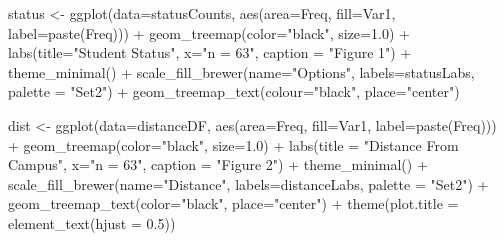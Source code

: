 \documentclass[
  letterpaper,
  DIV=11,
  numbers=noendperiod]{scrartcl}
\newenvironment{Shaded}{\begin{snugshade}}{\end{snugshade}}
\newcommand{\AttributeTok}[1]{\textcolor[rgb]{0.40,0.45,0.13}{#1}}
\newcommand{\FloatTok}[1]{\textcolor[rgb]{0.68,0.00,0.00}{#1}}
\newcommand{\FunctionTok}[1]{\textcolor[rgb]{0.28,0.35,0.67}{#1}}
\newcommand{\NormalTok}[1]{\textcolor[rgb]{0.00,0.23,0.31}{#1}}
\newcommand{\OtherTok}[1]{\textcolor[rgb]{0.00,0.23,0.31}{#1}}
\newcommand{\SpecialCharTok}[1]{\textcolor[rgb]{0.37,0.37,0.37}{#1}}
\newcommand{\StringTok}[1]{\textcolor[rgb]{0.13,0.47,0.30}{#1}}
\begin{document}
\begin{Shaded}
\begin{Highlighting}[]
\NormalTok{status }\OtherTok{\textless{}{-}} \FunctionTok{ggplot}\NormalTok{(}\AttributeTok{data=}\NormalTok{statusCounts, }\FunctionTok{aes}\NormalTok{(}\AttributeTok{area=}\NormalTok{Freq, }\AttributeTok{fill=}\NormalTok{Var1, }\AttributeTok{label=}\FunctionTok{paste}\NormalTok{(Freq))) }\SpecialCharTok{+} 
  \FunctionTok{geom\_treemap}\NormalTok{(}\AttributeTok{color=}\StringTok{"black"}\NormalTok{, }\AttributeTok{size=}\FloatTok{1.0}\NormalTok{) }\SpecialCharTok{+}
  \FunctionTok{labs}\NormalTok{(}\AttributeTok{title=}\StringTok{"Student Status"}\NormalTok{, }\AttributeTok{x=}\StringTok{"n = 63"}\NormalTok{, }\AttributeTok{caption =} \StringTok{"Figure 1"}\NormalTok{) }\SpecialCharTok{+} 
  \FunctionTok{theme\_minimal}\NormalTok{() }\SpecialCharTok{+}
  \FunctionTok{scale\_fill\_brewer}\NormalTok{(}\AttributeTok{name=}\StringTok{"Options"}\NormalTok{, }\AttributeTok{labels=}\NormalTok{statusLabs, }\AttributeTok{palette =} \StringTok{"Set2"}\NormalTok{) }\SpecialCharTok{+} 
  \FunctionTok{geom\_treemap\_text}\NormalTok{(}\AttributeTok{colour=}\StringTok{"black"}\NormalTok{, }\AttributeTok{place=}\StringTok{"center"}\NormalTok{) }
  

\NormalTok{dist }\OtherTok{\textless{}{-}} \FunctionTok{ggplot}\NormalTok{(}\AttributeTok{data=}\NormalTok{distanceDF, }\FunctionTok{aes}\NormalTok{(}\AttributeTok{area=}\NormalTok{Freq, }\AttributeTok{fill=}\NormalTok{Var1, }\AttributeTok{label=}\FunctionTok{paste}\NormalTok{(Freq))) }\SpecialCharTok{+} 
  \FunctionTok{geom\_treemap}\NormalTok{(}\AttributeTok{color=}\StringTok{"black"}\NormalTok{, }\AttributeTok{size=}\FloatTok{1.0}\NormalTok{) }\SpecialCharTok{+} 
  \FunctionTok{labs}\NormalTok{(}\AttributeTok{title =} \StringTok{"Distance From Campus"}\NormalTok{, }\AttributeTok{x=}\StringTok{"n = 63"}\NormalTok{, }\AttributeTok{caption =} \StringTok{"Figure 2"}\NormalTok{) }\SpecialCharTok{+}
  \FunctionTok{theme\_minimal}\NormalTok{() }\SpecialCharTok{+}
  \FunctionTok{scale\_fill\_brewer}\NormalTok{(}\AttributeTok{name=}\StringTok{"Distance"}\NormalTok{, }\AttributeTok{labels=}\NormalTok{distanceLabs, }\AttributeTok{palette =} \StringTok{"Set2"}\NormalTok{) }\SpecialCharTok{+} 
  \FunctionTok{geom\_treemap\_text}\NormalTok{(}\AttributeTok{color=}\StringTok{"black"}\NormalTok{, }\AttributeTok{place=}\StringTok{"center"}\NormalTok{) }\SpecialCharTok{+} 
  \FunctionTok{theme}\NormalTok{(}\AttributeTok{plot.title =} \FunctionTok{element\_text}\NormalTok{(}\AttributeTok{hjust =} \FloatTok{0.5}\NormalTok{))}


\end{Highlighting}
\end{Shaded}
\end{document}
